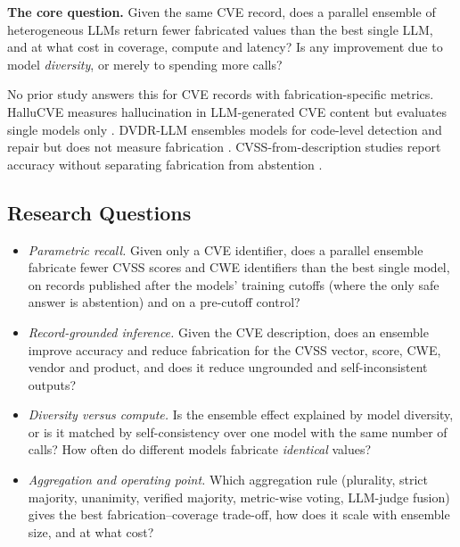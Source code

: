 \documentclass[11pt]{article}
\begin{document}
\begin{keyresult}
\textbf{The core question.} Given the same CVE record, does a parallel ensemble of heterogeneous LLMs return fewer fabricated values than the best single LLM, and at what cost in coverage, compute and latency? Is any improvement due to model \emph{diversity}, or merely to spending more calls?
\end{keyresult}

No prior study answers this for CVE records with fabrication-specific metrics. HalluCVE measures hallucination in LLM-generated CVE content but evaluates single models only \citep{dao2026hallucve}. DVDR-LLM ensembles models for code-level detection and repair but does not measure fabrication \citep{zibaeirad2025diverse}. CVSS-from-description studies report accuracy without separating fabrication from abstention \citep{jafarikhah2025description}.

\subsection{Research Questions}\label{sec:rq}
\begin{itemize}[leftmargin=2.2em]
\item[\textbf{RQ1.}] \emph{Parametric recall.} Given only a CVE identifier, does a parallel ensemble fabricate fewer CVSS scores and CWE identifiers than the best single model, on records published after the models' training cutoffs (where the only safe answer is abstention) and on a pre-cutoff control?
\item[\textbf{RQ2.}] \emph{Record-grounded inference.} Given the CVE description, does an ensemble improve accuracy and reduce fabrication for the CVSS vector, score, CWE, vendor and product, and does it reduce ungrounded and self-inconsistent outputs?
\item[\textbf{RQ3.}] \emph{Diversity versus compute.} Is the ensemble effect explained by model diversity, or is it matched by self-consistency over one model with the same number of calls? How often do different models fabricate \emph{identical} values?
\item[\textbf{RQ4.}] \emph{Aggregation and operating point.} Which aggregation rule (plurality, strict majority, unanimity, verified majority, metric-wise voting, LLM-judge fusion) gives the best fabrication--coverage trade-off, how does it scale with ensemble size, and at what cost?
\end{itemize}
\end{document}
